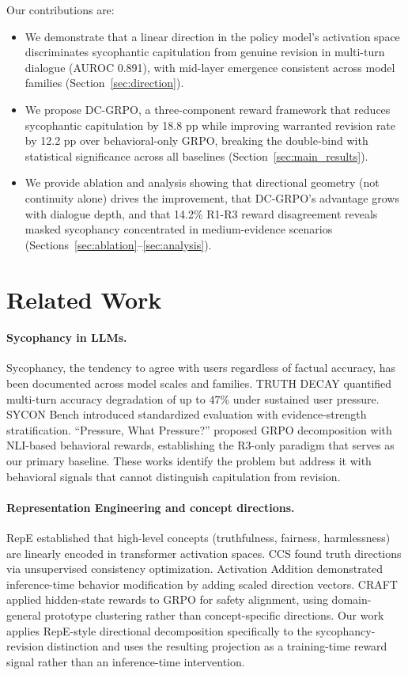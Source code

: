 \documentclass[11pt,a4paper]{article}
\begin{document}
Our contributions are:
\begin{itemize}
    \item We demonstrate that a linear direction in the policy model's activation space discriminates sycophantic capitulation from genuine revision in multi-turn dialogue (AUROC 0.891), with mid-layer emergence consistent across model families (Section~\ref{sec:direction}).
    \item We propose DC-GRPO, a three-component reward framework that reduces sycophantic capitulation by 18.8 pp while improving warranted revision rate by 12.2 pp over behavioral-only GRPO, breaking the double-bind with statistical significance across all baselines (Section~\ref{sec:main_results}).
    \item We provide ablation and analysis showing that directional geometry (not continuity alone) drives the improvement, that DC-GRPO's advantage grows with dialogue depth, and that 14.2\% R1-R3 reward disagreement reveals masked sycophancy concentrated in medium-evidence scenarios (Sections~\ref{sec:ablation}--\ref{sec:analysis}).
\end{itemize}

\section{Related Work}

\paragraph{Sycophancy in LLMs.}
Sycophancy, the tendency to agree with users regardless of factual accuracy, has been documented across model scales and families. TRUTH DECAY quantified multi-turn accuracy degradation of up to 47\% under sustained user pressure. SYCON Bench introduced standardized evaluation with evidence-strength stratification. ``Pressure, What Pressure?'' proposed GRPO decomposition with NLI-based behavioral rewards, establishing the R3-only paradigm that serves as our primary baseline. These works identify the problem but address it with behavioral signals that cannot distinguish capitulation from revision.

\paragraph{Representation Engineering and concept directions.}
RepE established that high-level concepts (truthfulness, fairness, harmlessness) are linearly encoded in transformer activation spaces. CCS found truth directions via unsupervised consistency optimization. Activation Addition demonstrated inference-time behavior modification by adding scaled direction vectors. CRAFT applied hidden-state rewards to GRPO for safety alignment, using domain-general prototype clustering rather than concept-specific directions. Our work applies RepE-style directional decomposition specifically to the sycophancy-revision distinction and uses the resulting projection as a training-time reward signal rather than an inference-time intervention.
\end{document}

